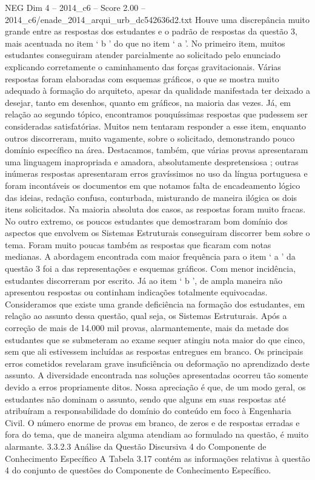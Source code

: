 \begin{textsample}{NEG Dim 4 – 2014\_c6 – Score 2.00 – 2014\_c6/enade\_2014\_arqui\_urb\_dc542636d2.txt}
Houve uma discrepância muito grande entre as respostas dos estudantes e o padrão de respostas da questão 3, mais acentuada no item ‘ b ’ do que no item ‘ a ’.
No primeiro item, muitos estudantes conseguiram atender parcialmente ao solicitado pelo enunciado explicando corretamente o caminhamento das forças gravitacionais.
Várias respostas foram elaboradas com esquemas gráficos, o que se mostra muito adequado à formação do arquiteto, apesar da qualidade manifestada ter deixado a desejar, tanto em desenhos, quanto em gráficos, na maioria das vezes.
Já, em relação ao segundo tópico, encontramos pouquíssimas respostas que pudessem ser consideradas satisfatórias.
Muitos nem tentaram responder a esse item, enquanto outros discorreram, muito vagamente, sobre o solicitado, demonstrando pouco domínio específico na área.
Destacamos, também, que várias provas apresentaram uma linguagem inapropriada e amadora, absolutamente despretensiosa ; outras inúmeras respostas apresentaram erros gravíssimos no uso da língua portuguesa e foram incontáveis os documentos em que notamos falta de encadeamento lógico das ideias, redação confusa, conturbada, misturando de maneira ilógica os dois itens solicitados.
Na maioria absoluta dos casos, as respostas foram muito fracas.
No outro extremo, os poucos estudantes que demostraram bom domínio dos aspectos que envolvem os Sistemas Estruturais conseguiram discorrer bem sobre o tema.
Foram muito poucas também as respostas que ficaram com notas medianas.
A abordagem encontrada com maior frequência para o item ‘ a ’ da questão 3 foi a das representações e esquemas gráficos.
Com menor incidência, estudantes discorreram por escrito.
Já ao item ‘ b ’, de ampla maneira não apresentou respostas ou continham indicações totalmente equivocadas.
Consideramos que existe uma grande deficiência na formação dos estudantes, em relação ao assunto dessa questão, qual seja, os Sistemas Estruturais.
Após a correção de mais de 14.000 mil provas, alarmantemente, mais da metade dos estudantes que se submeteram ao exame sequer atingiu nota maior do que cinco, sem que ali estivessem incluídas as respostas entregues em branco.
Os principais erros cometidos revelaram grave insuficiência ou deformação no aprendizado deste assunto.
A diversidade encontrada nas soluções apresentadas ocorreu tão somente devido a erros propriamente ditos.
Nossa apreciação é que, de um modo geral, os estudantes não dominam o assunto, sendo que alguns em suas respostas até atribuíram a responsabilidade do domínio do conteúdo em foco à Engenharia Civil.
O número enorme de provas em branco, de zeros e de respostas erradas e fora do tema, que de maneira alguma atendiam ao formulado na questão, é muito alarmante. 3.3.2.3 Análise da Questão Discursiva 4 do Componente de Conhecimento Específico A Tabela 3.17 contém as informações relativas à questão 4 do conjunto de questões do Componente de Conhecimento Específico.

\end{textsample}
